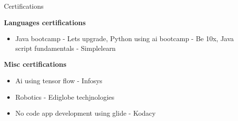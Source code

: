 
\begin{rSection}{Certifications}
\vspace{-.4cm}

\item{\bf Languages certifications}\\
[-0.4cm]
  \begin{itemize}[leftmargin=*]

	\itemsep \sepval
  \item Java bootcamp - Lets upgrade, Python using ai bootcamp - Be 10x, Java script fundamentals - Simplelearn
\end{itemize}

\item{\bf Misc certifications}\\
[-0.4cm]
\begin{itemize}[leftmargin=*]

	\itemsep \sepval
  \item Ai using tensor flow - Infosys
  \item Robotics - Ediglobe techjnologies
  \item No code app development using glide - Kodacy

\end{itemize}

\end{rSection}

